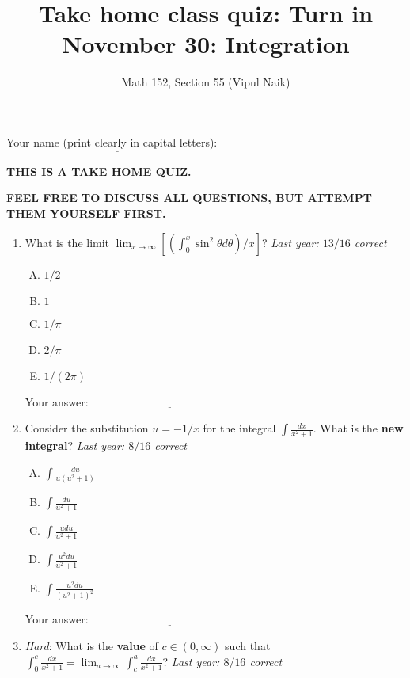 \documentclass[10pt]{amsart}
\title{Take home class quiz: Turn in November 30: Integration}
\author{Math 152, Section 55 (Vipul Naik)}
\begin{document}
\maketitle

Your name (print clearly in capital letters): $\underline{\qquad\qquad\qquad\qquad\qquad\qquad\qquad\qquad\qquad\qquad}$

{\bf THIS IS A TAKE HOME QUIZ.}

{\bf FEEL FREE TO DISCUSS ALL QUESTIONS, BUT ATTEMPT THEM YOURSELF FIRST.}

\begin{enumerate}
\item What is the limit $\lim_{x \to \infty} \left[\left(\int_0^x
  \sin^2 \theta d\theta\right)/x\right]$? {\em Last year: $13/16$
  correct}

  \begin{enumerate}[(A)]
  \item $1/2$
  \item $1$
  \item $1/\pi$
  \item $2/\pi$
  \item $1/(2\pi)$
  \end{enumerate}

  \vspace{0.1in}
  Your answer: $\underline{\qquad\qquad\qquad\qquad\qquad\qquad\qquad}$
  \vspace{0.6in}

\item Consider the substitution $u = -1/x$ for the integral $\int
  \frac{dx}{x^2 + 1}$. What is the {\bf new integral}? {\em Last year:
  $8/16$ correct}

  \begin{enumerate}[(A)]
  \item $\int \frac{du}{u(u^2 + 1)}$
  \item $\int \frac{du}{u^2 + 1}$
  \item $\int \frac{ u du}{u^2 + 1}$
  \item $\int \frac{u^2 du}{u^2 + 1}$
  \item $\int \frac{u^2 du}{(u^2 + 1)^2}$ 
  \end{enumerate}

  \vspace{0.1in}
  Your answer: $\underline{\qquad\qquad\qquad\qquad\qquad\qquad\qquad}$
  \vspace{0.6in}

\item {\em Hard}: What is the {\bf value} of $c \in (0,\infty)$ such
  that $\int_0^c \frac{dx}{x^2 + 1} = \lim_{a \to \infty} \int_c^a
  \frac{dx}{x^2 + 1}$? {\em Last year: $8/16$ correct}


\end{enumerate}
\end{document}
